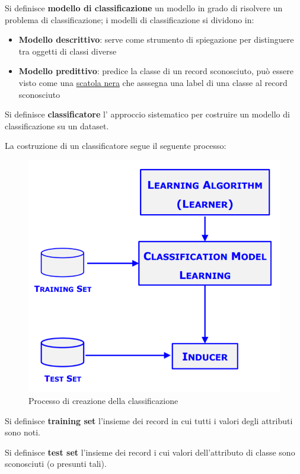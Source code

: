 \begin{defn}
	 Si definisce \textbf{modello di classificazione} un modello in grado di risolvere un problema di classificazione; i modelli di classificazione si dividono in:
	\begin{itemize}
		\item \textbf{Modello descrittivo}: serve come strumento di spiegazione per distinguere tra oggetti di classi diverse
		\item \textbf{Modello predittivo}: predice la classe di un record sconosciuto, pu\`o essere visto come una \underline{scatola nera} che asssegna una label di una classe al record sconosciuto
	\end{itemize}
\end{defn}

\begin{defn}
	Si definisce \textbf{classificatore} l' approccio sistematico per costruire un modello di classificazione su un dataset.
\end{defn}
La costruzione di un classificatore segue il seguente processo:
\begin{figure}[H]
	\centering
	\includegraphics[height=0.6 \linewidth]{classification/pict/class_process.png}
	\caption{Processo di creazione della classificazione}
\end{figure}

\begin{defn}
	Si definisce \textbf{training set}  l'insieme dei record in cui tutti i valori degli attributi sono noti.
\end{defn}

\begin{defn}
	Si definisce \textbf{test set} l'insieme dei record i cui valori dell'attributo di classe sono sconosciuti (o presunti tali).
\end{defn}

